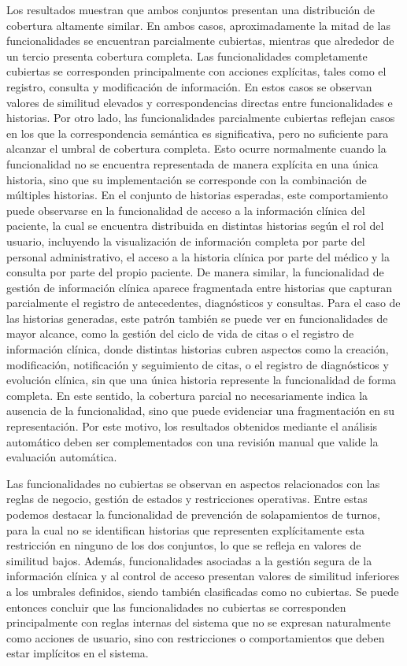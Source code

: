 Los resultados muestran que ambos conjuntos presentan una distribución de cobertura altamente similar. En ambos casos, aproximadamente la mitad de las funcionalidades se encuentran parcialmente cubiertas, mientras que alrededor de un tercio presenta cobertura completa.
Las funcionalidades completamente cubiertas se corresponden principalmente con acciones explícitas, tales como el registro, consulta y modificación de información. En estos casos se observan valores de similitud elevados y correspondencias directas entre funcionalidades e historias.
Por otro lado, las funcionalidades parcialmente cubiertas reflejan casos en los que la correspondencia semántica es significativa, pero no suficiente para alcanzar el umbral de cobertura completa. Esto ocurre normalmente cuando la funcionalidad no se encuentra representada de manera explícita en una única historia, sino que su implementación se corresponde con la combinación de múltiples historias. En el conjunto de historias esperadas, este comportamiento puede observarse en la funcionalidad de acceso a la información clínica del paciente, la cual se encuentra distribuida en distintas historias según el rol del usuario, incluyendo la visualización de información completa por parte del personal administrativo, el acceso a la historia clínica por parte del médico y la consulta por parte del propio paciente. De manera similar, la funcionalidad de gestión de información clínica aparece fragmentada entre historias que capturan parcialmente el registro de antecedentes, diagnósticos y consultas. Para el caso de las historias generadas, este patrón también se puede ver en funcionalidades de mayor alcance, como la gestión del ciclo de vida de citas o el registro de información clínica, donde distintas historias cubren aspectos como la creación, modificación, notificación y seguimiento de citas, o el registro de diagnósticos y evolución clínica, sin que una única historia represente la funcionalidad de forma completa.
En este sentido, la cobertura parcial no necesariamente indica la ausencia de la funcionalidad, sino que puede evidenciar una fragmentación en su representación. Por este motivo, los resultados obtenidos mediante el análisis automático deben ser complementados con una revisión manual que valide la evaluación automática.

Las funcionalidades no cubiertas se observan en aspectos relacionados con las reglas de negocio, gestión de estados y restricciones operativas. Entre estas podemos destacar la funcionalidad de prevención de solapamientos de turnos, para la cual no se identifican historias que representen explícitamente esta restricción en ninguno de los dos conjuntos, lo que se refleja en valores de similitud bajos. Además, funcionalidades asociadas a la gestión segura de la información clínica y al control de acceso presentan valores de similitud inferiores a los umbrales definidos, siendo también clasificadas como no cubiertas. Se puede entonces concluir que las funcionalidades no cubiertas se corresponden principalmente con reglas internas del sistema que no se expresan naturalmente como acciones de usuario, sino con restricciones o comportamientos que deben estar implícitos en el sistema.

